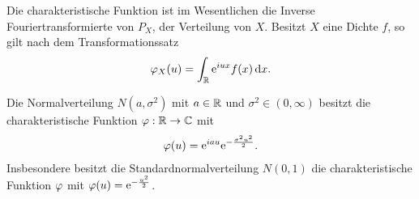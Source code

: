Die charakteristische Funktion ist im Wesentlichen die Inverse
Fouriertransformierte von $P_X$, der Verteilung von $X$. Besitzt $X$ eine
Dichte $f$, so gilt nach dem Transformationssatz
\begin{align*}
\varphi_X(u) = \int_{\mathbb{R}} \mathrm{e}^{iux}f(x)\,\mathrm{d} x.
\end{align*}

\begin{bem}
\label{bem:6.4}
Die Normalverteilung $N(a,\sigma ^ {2})$ mit $a \in \mathbb{R}$ und $\sigma ^ {2} \in
(0,\infty )$ besitzt die charakteristische Funktion $\varphi : \mathbb{R}\to\mathbb{C} $ mit
\begin{align*}
\varphi(u) = \mathrm{e}^{iau} \mathrm{e}^ {-\frac{\sigma^ {2}u^ {2}}{2}}.
\end{align*}
Insbesondere besitzt die Standardnormalverteilung $N(0,1)$ die charakteristische
Funktion $\varphi $ mit $\varphi(u) = \mathrm{e}^ {-\frac{u^ {2}}{2}}$.\maphere
\end{bem}
